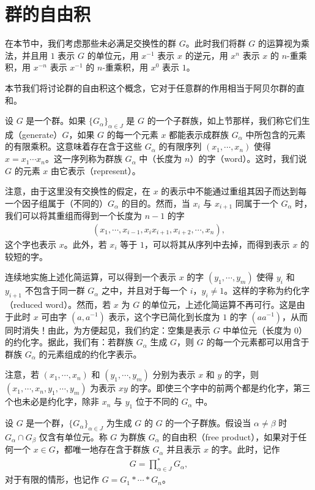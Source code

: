 \documentclass[../../main.tex]{subfiles}
\begin{document}
\section{群的自由积}\label{section:ch11-群的自由积}

在本节中，我们考虑那些未必满足交换性的群 $G$。此时我们将群 $G$ 的运算视为乘法，并且用 $1$ 表示 $G$ 的单位元，用 $x^{-1}$ 表示 $x$ 的逆元，用 $x^n$ 表示 $x$ 的 $n$-重乘积，用 $x^{-n}$ 表示 $x^{-1}$ 的 $n$-重乘积，用 $x^0$ 表示 $1$。

本节我们将讨论群的自由积这个概念，它对于任意群的作用相当于阿贝尔群的直和。

设 $G$ 是一个群。如果 $\{G_\alpha\}_{\alpha\in J}$ 是 $G$ 的一个子群族，如上节那样，我们称它们生成（generate）$G$，如果 $G$ 的每一个元素 $x$ 都能表示成群族 $G_\alpha$ 中所包含的元素的有限乘积。这意味着存在含于这些 $G_\alpha$ 的有限序列 $(x_1,\cdots,x_n)$ 使得 $x=x_1\cdots x_n$。这一序列称为群族 $G_\alpha$ 中（长度为 $n$）的字（word）。这时，我们说 $G$ 的元素 $x$ 由它表示（represent）。

注意，由于这里没有交换性的假定，在 $x$ 的表示中不能通过重组其因子而达到每一个因子组属于（不同的）$G_\alpha$ 的目的。然而，当 $x_i$ 与 $x_{i+1}$ 同属于一个 $G_\alpha$ 时，我们可以将其重组而得到一个长度为 $n-1$ 的字
\begin{align*}
(x_1,\cdots,x_{i-1},x_i x_{i+1},x_{i+2},\cdots,x_n),
\end{align*}
这个字也表示 $x$。此外，若 $x_i$ 等于 $1$，可以将其从序列中去掉，而得到表示 $x$ 的较短的字。

连续地实施上述化简运算，可以得到一个表示 $x$ 的字 $(y_1,\cdots,y_m)$ 使得 $y_i$ 和 $y_{i+1}$ 不包含于同一群 $G_\alpha$ 之中，并且对于每一个 $i$，$y_i\neq 1$。这样的字称为约化字（reduced word）。然而，若 $x$ 为 $G$ 的单位元，上述化简运算不再可行。这是由于此时 $x$ 可由字 $(a,a^{-1})$ 表示，这个字已简化到长度为 $1$ 的字 $(aa^{-1})$，从而同时消失！由此，为方便起见，我们约定：空集是表示 $G$ 中单位元（长度为 $0$）的约化字。据此，我们有：若群族 $G_\alpha$ 生成 $G$，则 $G$ 的每一个元素都可以用含于群族 $G_\alpha$ 的元素组成的约化字表示。

注意，若 $(x_1,\cdots,x_n)$ 和 $(y_1,\cdots,y_m)$ 分别为表示 $x$ 和 $y$ 的字，则 $(x_1,\cdots,x_n,y_1,\cdots,y_m)$ 为表示 $xy$ 的字。即使三个字中的前两个都是约化字，第三个也未必是约化字，除非 $x_n$ 与 $y_1$ 位于不同的 $G_\alpha$ 中。

\begin{definition}[群的自由积]\label{definition:ch11-free-product}
设 $G$ 是一个群，$\{G_\alpha\}_{\alpha\in J}$ 为生成 $G$ 的 $G$ 的一个子群族。假设当 $\alpha\neq\beta$ 时 $G_\alpha\cap G_\beta$ 仅含有单位元。称 $G$ 为群族 $G_\alpha$ 的自由积（free product），如果对于任何一个 $x\in G$，都唯一地存在含于群族 $G_\alpha$ 并且表示 $x$ 的字。此时，记作
\begin{align*}
G=\prod_{\alpha\in J}^{*}G_\alpha,
\end{align*}
对于有限的情形，也记作 $G=G_1*\cdots*G_n$。
\end{definition}
\end{document}
